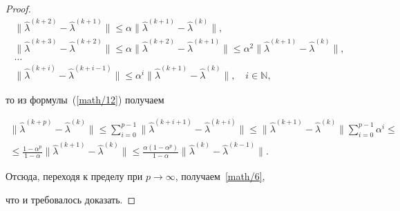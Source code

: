 \begin{proof}
\begin{gather*}
\bigl\|\hat{\lambda}^{( k+2 ) }-\hat{\lambda}^{( k+1 ) }\bigr\|\leq

\alpha\bigl\|\hat{\lambda}^{( k+1 ) }-\hat{\lambda}^{( k ) }\bigr\|, \\

\bigl\|\hat{\lambda}^{( k+3 ) }-\hat{\lambda}^{( k+2 ) }\bigr\|\leq

\alpha\bigl\|\hat{\lambda}^{( k+2 ) }-\hat{\lambda}^{( k+1 ) }\bigr\|\leq

\alpha^2\bigl\|\hat{\lambda}^{( k+1 ) }-\hat{\lambda}^{( k ) }\bigr\|, \\

\dots\\

\bigl\|\hat{\lambda}^{( k+i ) }-\hat{\lambda}^{( k+i-1 ) }\bigr\|\leq

\alpha^i\bigl\|\hat{\lambda}^{( k+1 ) }-\hat{\lambda}^{( k ) }\bigr\|, \quad   i\in \mathbb N,

\end{gather*}

то из формулы~(\ref{math/12}) получаем

\begin{multline*}

\bigl\|\hat{\lambda}^{( k+p ) }-\hat{\lambda}^{( k ) }\bigr\|\leq

\sum_{i=0}^{p-1}\bigl\|\hat{\lambda}^{( k+i+1 ) }-\hat{\lambda}^{( k+i ) }\bigr\|\leq

\bigl\|\hat{\lambda}^{( k+1 ) }-\hat{\lambda}^{( k ) }\bigr\|\sum_{i=0}^{p-1}\alpha^i\leq \\

\leq

\frac{1-\alpha^p}{1-\alpha}

    \bigl\|\hat{\lambda}^{( k+1 ) }-\hat{\lambda}^{( k ) }\bigr\|\leq

    \frac{\alpha( 1-\alpha^p ) }{1-\alpha}\bigl\|\hat{\lambda}^{( k ) }-\hat{\lambda}^{( k-1 ) }\bigr\|.

\end{multline*}

    Отсюда,  переходя к пределу при $p\to\infty$,  получаем~\eqref{math/6},





что и требовалось доказать.

\end{proof}



